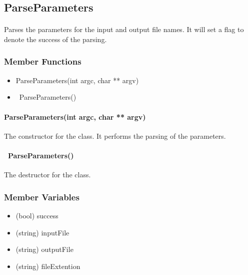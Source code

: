 \hypertarget{fileconversion_parseparameters}
{
    \label{fileconversion_parseparameters}
}

\subsection{ParseParameters}
    \paragraph{}
        Parses the parameters for the input and output file names.  It will set a flag to denote the success of the parsing.

    \subsubsection{Member Functions}

        \begin{itemize}
            \item ParseParameters(int argc, char ** argv)
            \item ~ParseParameters()
        \end{itemize}

        \paragraph{ParseParameters(int argc, char ** argv)}
            \hfill \break
            The constructor for the class.  It performs the parsing of the parameters.   
        
        \paragraph{~ParseParameters()}
            \hfill \break
            The destructor for the class.

    \subsubsection{Member Variables}
        
        \begin{itemize}
            \item (bool) success
            \item (string) inputFile
            \item (string) outputFile
            \item (string) fileExtention
        \end{itemize}


